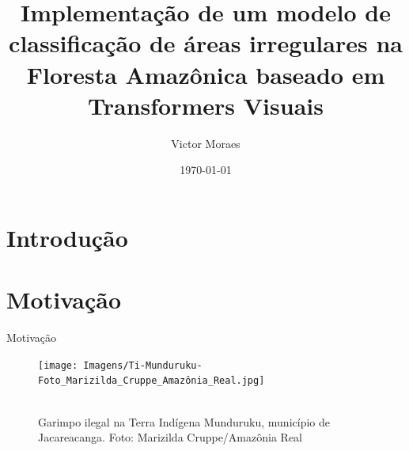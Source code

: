 \documentclass{beamer}
\title{Implementação de um modelo de classificação de áreas irregulares na Floresta Amazônica baseado em Transformers Visuais}
\author{Victor Moraes}
\institute{UFMG}
\date{\today}
\begin{document}
\frame{\titlepage}

\section{Introdução} 

\section{Motivação} 
\begin{frame}{Motivação}  

    \begin{figure}[!h]
    \centering
    \texttt{[image: Imagens/Ti-Munduruku-Foto\_Marizilda\_Cruppe\_Amazônia\_Real.jpg]}
    \caption[width=0.2\columnwidth]{\\\small Garimpo ilegal na Terra Indígena Munduruku, município de Jacareacanga. Foto: Marizilda Cruppe/Amazônia Real}
    \label{fig:garimpo}
    \end{figure}


\end{frame}
\end{document}
